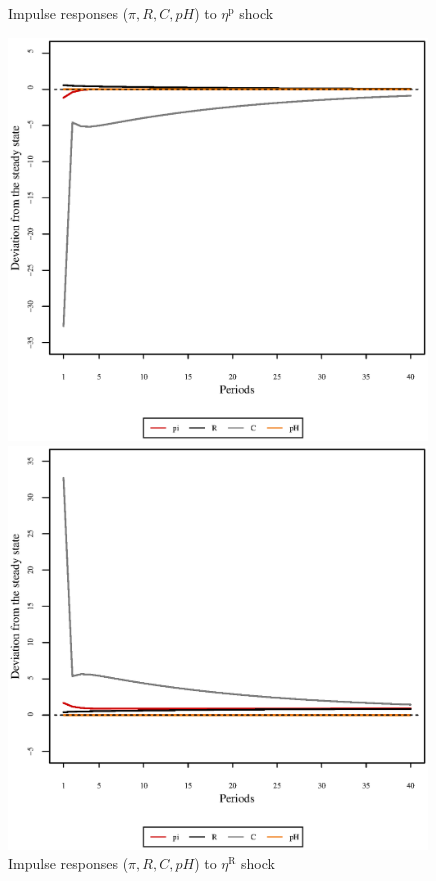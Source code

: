 \begin{figure}[h]
\begin{minipage}{0.5\textwidth}
\caption{Impulse responses ($\pi, R, C, {p\!H}$) to $\eta^{\mathrm{p}}$ shock}
\end{minipage}
\end{figure}

\begin{figure}[h]
\begin{minipage}{0.5\textwidth}
\vspace*{-3em}
\centering
\includegraphics[width=0.99\textwidth, scale=0.55]{plots/plot_23.eps}
\caption{Impulse responses ($\pi, R, C, {p\!H}$) to $\eta^{\mathrm{R}}$ shock}
\end{minipage}
\begin{minipage}{0.5\textwidth}
\vspace*{-3em}
\centering
\includegraphics[width=0.99\textwidth, scale=0.55]{plots/plot_24.eps}

\end{minipage}
\end{figure}
